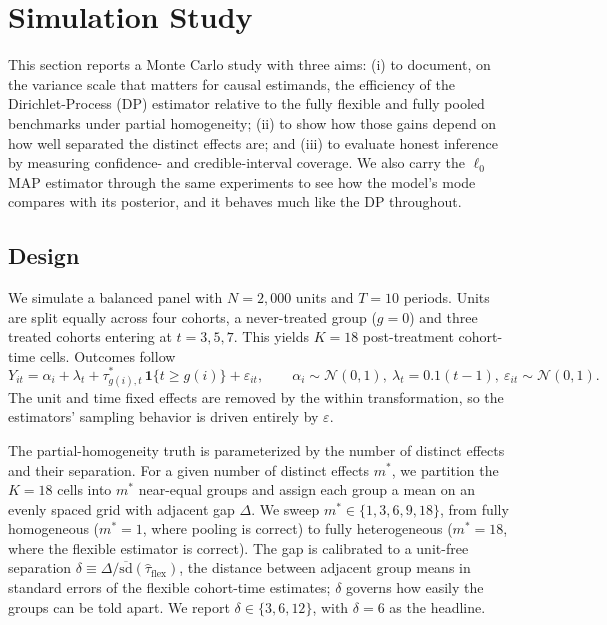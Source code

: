 \documentclass[margin=5in, 12pt]{article}
\newcommand{\1}{\mathbbm{1}}
\begin{document}
\section{Simulation Study}
\label{sec:sim}

This section reports a Monte Carlo study with three aims: (i) to document, on the
variance scale that matters for causal estimands, the efficiency of the
Dirichlet-Process (DP) estimator relative to the fully flexible and fully
pooled benchmarks under partial homogeneity; (ii) to show how those gains depend
on how well separated the distinct effects are; and (iii) to evaluate honest
inference by measuring confidence- and credible-interval coverage. We also carry
the $\ell_0$ MAP estimator through the same experiments to see how the model's
mode compares with its posterior, and it behaves much like the DP throughout.

\subsection{Design}
\label{sec:sim:design}

We simulate a balanced panel with $N = 2{,}000$ units and $T = 10$ periods.
Units are split equally across four cohorts, a never-treated group ($g=0$) and
three treated cohorts entering at $t = 3,5,7$. This yields $K = 18$
post-treatment cohort-time cells. Outcomes follow
\begin{equation}
  Y_{it} = \alpha_i + \lambda_t
    + \tau^{\ast}_{g(i),t}\,\mathbf{1}\{t \ge g(i)\} + \varepsilon_{it},
  \qquad
  \alpha_i \sim \mathcal N(0,1),\ \lambda_t = 0.1(t-1),\ \varepsilon_{it}\sim\mathcal N(0,1).
  \label{eq:sim:dgp}
\end{equation}
The unit and time fixed effects are removed by the within transformation, so the
estimators' sampling behavior is driven entirely by $\varepsilon$.

The partial-homogeneity truth is parameterized by the number of distinct effects
and their separation. For a given number of distinct effects $m^{\ast}$, we partition the $K=18$ cells
into $m^{\ast}$ near-equal groups and assign each group a mean on an evenly
spaced grid with adjacent gap $\Delta$. We sweep
$m^{\ast}\in\{1,3,6,9,18\}$, from fully homogeneous ($m^{\ast}=1$, where pooling
is correct) to fully heterogeneous ($m^{\ast}=18$, where the flexible estimator
is correct). The gap is calibrated to a unit-free separation
$\delta \equiv \Delta / \overline{\mathrm{sd}}(\hat\tau_{\text{flex}})$, the
distance between adjacent group means in standard errors of the flexible
cohort-time estimates; $\delta$ governs how easily the groups can be told apart.
We report $\delta \in \{3,6,12\}$, with $\delta=6$ as the headline.
\end{document}
